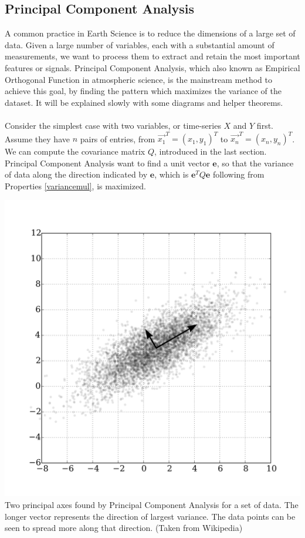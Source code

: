 \subsection{Principal Component Analysis}
A common practice in Earth Science is to reduce the dimensions of a large set of data. Given a large number of variables, each with a substantial amount of measurements, we want to process them to extract and retain the most important features or signals. Principal Component Analysis, which also known as Empirical Orthogonal Function in atmospheric science, is the mainstream method to achieve this goal, by finding the pattern which maximizes the variance of the dataset. It will be explained slowly with some diagrams and helper theorems.\\
\\
Consider the simplest case with two variables, or time-series $X$ and $Y$ first. Assume they have $n$ pairs of entries, from $\vec{x_1}^T = (x_1, y_1)^T$ to $\vec{x_n}^T = (x_{n}, y_{n})^T$. We can compute the covariance matrix $Q$, introduced in the last section. Principal Component Analysis want to find a unit vector $\textbf{e}$, so that the variance of data along the direction indicated by $\textbf{e}$, which is $\textbf{e}^T Q \textbf{e}$ following from Properties \ref{variancemul}, is maximized.
\begin{center}
\includegraphics[scale = 0.15]{1200px-GaussianScatterPCA.svg.png}\\
Two principal axes found by Principal Component Analysis for a set of data. The longer vector represents the direction of largest variance. The data points can be seen to spread more along that direction. (Taken from Wikipedia)
\end{center}
